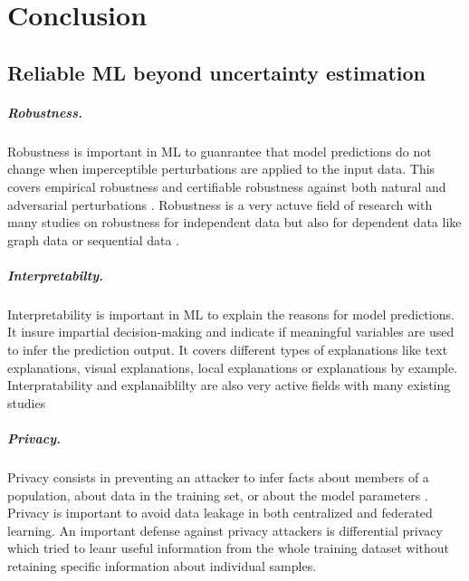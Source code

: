 \chapter{Conclusion}
\label{chap:conclusion}

\section{Reliable ML beyond uncertainty estimation}

\paragraph{Robustness.} Robustness is important in ML to guanrantee that model predictions do not change when imperceptible perturbations are applied to the input data. This covers empirical robustness and certifiable robustness against both natural and adversarial perturbations \cite{tu2020empirical, chun2020empirical, cohen2019smoothing, zugner2020certifiable}. Robustness is a very actuve field of research with many studies on robustness for independent data \cite{silva2020opportunies} but also for dependent data like graph data \cite{GNNBook-ch8-gunnemann} or sequential data \cite{cheng2018sequential}.

\paragraph{Interpretabilty.} Interpretability is important in ML to explain the reasons for model predictions. It insure impartial decision-making and indicate if meaningful variables are used to infer the prediction output. It covers different types of explanations like text explanations, visual explanations, local explanations or explanations by example. Interpratability and explanaiblilty are also very active fields with many existing studies \cite{arrieta2019explainable, murdoch2019interpretable}

\paragraph{Privacy.} Privacy consists in preventing an attacker to infer facts about members of a population, about data in the training set, or about the model parameters \cite{cristofaro2020privacy, cristofaro2021privacy}. Privacy is important to avoid data leakage in both centralized and federated learning. An important defense against privacy attackers is differential privacy \cite{buglesi2006privacy} which tried to leanr useful information from the whole training dataset without retaining specific information about individual samples.

